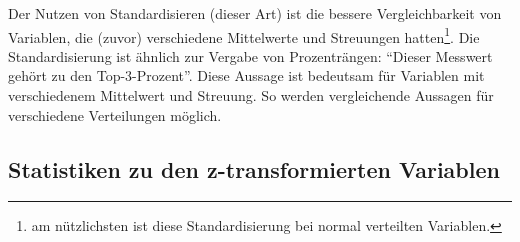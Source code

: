 \documentclass[
  a4paper,
  DIV=11]{scrreprt}
\theoremstyle{definition}
\theoremstyle{remark}
\begin{document}
Der Nutzen von Standardisieren (dieser Art) ist die bessere
Vergleichbarkeit von Variablen, die (zuvor) verschiedene Mittelwerte und
Streuungen hatten\footnote{am nützlichsten ist diese Standardisierung
  bei normal verteilten Variablen.}. Die Standardisierung ist ähnlich
zur Vergabe von Prozenträngen: ``Dieser Messwert gehört zu den
Top-3-Prozent''. Diese Aussage ist bedeutsam für Variablen mit
verschiedenem Mittelwert und Streuung. So werden vergleichende Aussagen
für verschiedene Verteilungen möglich.

\hypertarget{statistiken-zu-den-z-transformierten-variablen}{%
\subsection{Statistiken zu den z-transformierten
Variablen}\label{statistiken-zu-den-z-transformierten-variablen}}
\end{document}
